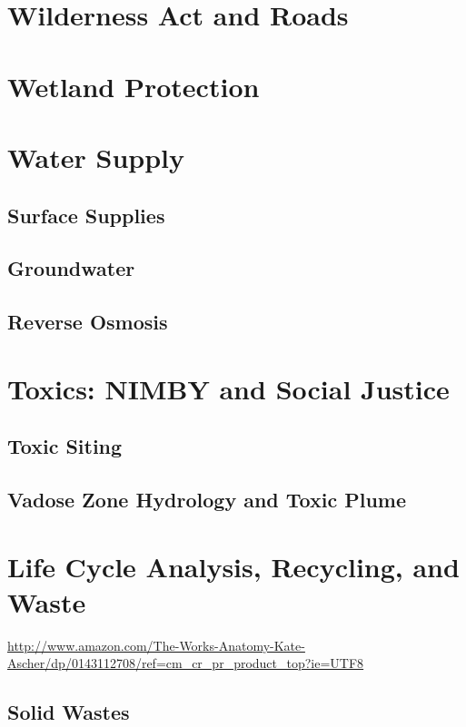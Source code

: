\documentclass{tufte-book}\usepackage[]{graphicx}\usepackage[]{xcolor}
\begin{document}
\chapter{Wilderness Act and Roads}

\chapter{Wetland Protection}

\chapter{Water Supply}

\section{Surface Supplies}

\section{Groundwater}

\section{Reverse Osmosis}

\chapter{Toxics: NIMBY and Social Justice}

\section{Toxic Siting}


\section{Vadose Zone Hydrology and Toxic Plume}


\chapter{Life Cycle Analysis, Recycling, and Waste}

\url{http://www.amazon.com/The-Works-Anatomy-Kate-Ascher/dp/0143112708/ref=cm_cr_pr_product_top?ie=UTF8}

\section{Solid Wastes}
\end{document}
